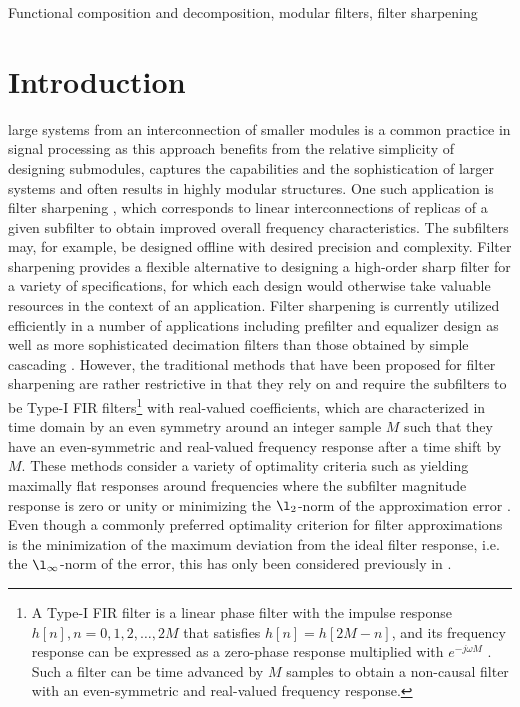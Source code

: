 \documentclass[journal] {IEEEtran}
\begin{document}
\begin{IEEEkeywords}
Functional composition and decomposition, modular filters, filter sharpening
\end{IEEEkeywords}



\IEEEpeerreviewmaketitle



\section{Introduction}


 large systems from an interconnection of smaller modules is a common practice in signal processing as this approach benefits from the relative simplicity of designing submodules, captures the capabilities and the sophistication of larger systems and often results in highly modular structures. One such application is filter sharpening \cite{Kaiser1977}, which corresponds to linear interconnections of replicas of a given subfilter to obtain improved overall frequency characteristics. The subfilters may, for example, be designed offline with desired precision and complexity. Filter sharpening provides a flexible alternative to designing a high-order sharp filter for a variety of specifications, for which each design would otherwise take valuable resources in the context of an application. Filter sharpening is currently utilized efficiently in a number of applications including prefilter and equalizer design \cite{Adams1984,Cabezas1989,Jiang1990} as well as more sophisticated decimation filters than those obtained by simple cascading \cite{Kwentus1997}. However, the traditional methods that have been proposed for filter sharpening \cite{Kaiser1977, Nakamura, Saramaki, Hartnett1995, Chen, Samadi2000} are rather restrictive in that they rely on and require the subfilters to be Type-I FIR filters\footnote{A Type-I FIR filter is a linear phase filter with the impulse response $h[n], n=0,1,2,\dots,2M$ that satisfies $h[n]=h[2M-n]$, and its frequency response can be expressed as a zero-phase response multiplied with $e^{-j\omega M}$ \cite{Oppenheim}. Such a filter can be time advanced by $M$ samples to obtain a non-causal filter with an even-symmetric and real-valued frequency response.} with real-valued coefficients, which are characterized in time domain by an even symmetry around an integer sample $M$ such that they have an even-symmetric and real-valued frequency response after a time shift by $M$. These methods consider a variety of optimality criteria such as yielding maximally flat responses around frequencies where the subfilter magnitude response is zero or unity \cite{Kaiser1977, Hartnett1995, Samadi2000} or minimizing the $\l_2$-norm of the approximation error \cite{Nakamura}. Even though a commonly preferred optimality criterion for filter approximations is the minimization of the maximum deviation from the ideal filter response, i.e. the $\l_{\infty}$-norm of the error, this has only been considered previously in \cite{Saramaki}.
\end{document}
